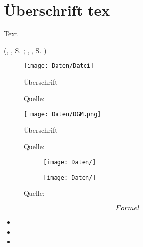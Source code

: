 
\section[Überschrift]{\texorpdfstring{Überschrift tex}{Überschrift pdf}}


\textcolor{HCU}{}
\textcolor{red1}{}


\glqq Text\grqq{}


(\citeauthor{}, \citeyearNP{}, S. ; \citeauthor{}, \citeyearNP{}, S. )


\begin{figure}[H]
	\centering
	\texttt{[image: Daten/Datei]}
	\caption{Überschrift}
	\caption*{Quelle: \citeA{}}
	\label{fig:}
\end{figure}


\begin{figure}[H]
	\centering
	\texttt{[image: Daten/DGM.png]}
	\caption{Überschrift}
	\caption*{Quelle: \citeA{}}
	\label{fig:}
\end{figure}


\begin{figure}[H]
	\begin{subfigure}[c]{0.48\textwidth}
		\texttt{[image: Daten/]}
		\subcaption{}
		\label{fig:}
	\end{subfigure}
	\hfill
	\begin{subfigure}[c]{0.48\textwidth}
		\texttt{[image: Daten/]}
		\subcaption{}
		\label{fig:}
	\end{subfigure}
	\caption{}
	\caption*{Quelle: \citeA[]{}}
	\label{fig:}
\end{figure}


\begin{equation}
	\numberwithin{equation}{section}
	Formel \label{eq:Label} \\
\end{equation}





\begin{itemize}	
	\setlength{\itemsep}{-2pt}
	\item 
	\item 
	\item 
\end{itemize}


